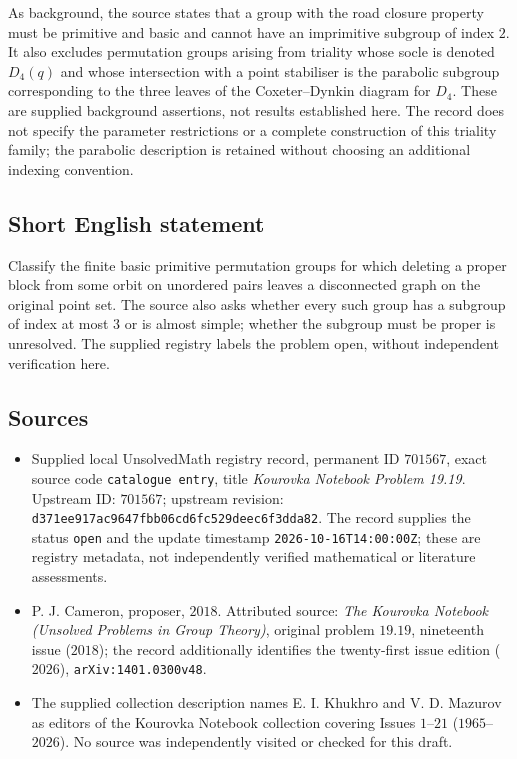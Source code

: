 \documentclass[11pt]{article}
\begin{document}
As background, the source states that a group with the road closure property must be primitive and basic and cannot have an imprimitive subgroup of index \(2\). It also excludes permutation groups arising from triality whose socle is denoted \(D_4(q)\) and whose intersection with a point stabiliser is the parabolic subgroup corresponding to the three leaves of the Coxeter--Dynkin diagram for \(D_4\). These are supplied background assertions, not results established here. The record does not specify the parameter restrictions or a complete construction of this triality family; the parabolic description is retained without choosing an additional indexing convention.
\subsection{Short English statement}
Classify the finite basic primitive permutation groups for which deleting a proper block from some orbit on unordered pairs leaves a disconnected graph on the original point set. The source also asks whether every such group has a subgroup of index at most \(3\) or is almost simple; whether the subgroup must be proper is unresolved. The supplied registry labels the problem open, without independent verification here.
\subsection{Sources}
\begin{itemize}
\item Supplied local UnsolvedMath registry record, permanent ID \(701567\), exact source code \texttt{catalogue entry}, title \emph{Kourovka Notebook Problem 19.19}. Upstream ID: \(701567\); upstream revision: \texttt{d371ee917ac9647fbb06cd6fc529deec6f3dda82}. The record supplies the status \texttt{open} and the update timestamp \texttt{2026-10-16T14:00:00Z}; these are registry metadata, not independently verified mathematical or literature assessments.
\item P. J. Cameron, proposer, \(2018\). Attributed source: \emph{The Kourovka Notebook (Unsolved Problems in Group Theory)}, original problem \(19.19\), nineteenth issue (\(2018\)); the record additionally identifies the twenty-first issue edition (\(2026\)), \texttt{arXiv:1401.0300v48}.
\item The supplied collection description names E. I. Khukhro and V. D. Mazurov as editors of the Kourovka Notebook collection covering Issues \(1\)--\(21\) (\(1965\)--\(2026\)). No source was independently visited or checked for this draft.
\end{itemize}
\end{document}
